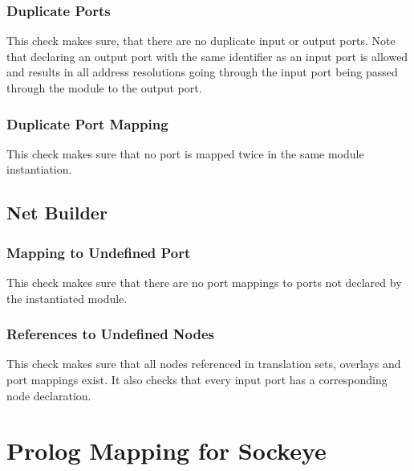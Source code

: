 \documentclass[a4paper,11pt,twoside]{report}
\begin{document}
{{{\subsection{Duplicate Ports}
This check makes sure, that there are no duplicate input or output ports.
Note that declaring an output port with the same identifier as an input port is allowed and results in all address resolutions going through the input port being passed through the module to the output port.

\subsection{Duplicate Port Mapping}
This check makes sure that no port is mapped twice in the same module instantiation.

\section{Net Builder}

\subsection{Mapping to Undefined Port}
This check makes sure that there are no port mappings to ports not declared by the instantiated module.

\subsection{References to Undefined Nodes}
This check makes sure that all nodes referenced in translation sets, overlays and port mappings exist.
It also checks that every input port has a corresponding node declaration.


\chapter{Prolog Mapping for Sockeye}
\label{chap:prolog}

}}}
\end{document}
